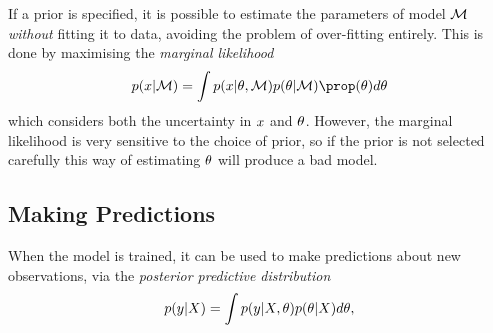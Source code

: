 If a prior is specified, it is possible to estimate the parameters of
model $\mathcal{M}$ \textit{without} fitting it to data, avoiding the
problem of over-fitting entirely. This is done by maximising the
\textit{marginal likelihood}
\begin{equation}
  \label{eq:marginal-likelihod}
  \prob(\obs \vert \model) = \int \prob(\obs \vert \hyperparam,
  \model) \prob(\hyperparam \vert \model) \prop(\hyperparam) d\hyperparam
\end{equation}
which considers both the uncertainty in $x$ and
$\theta$. However, the marginal likelihood is very sensitive to
the choice of prior, so if the prior is not selected carefully this
way of estimating $\theta$ will produce a bad model.

\subsection{Making Predictions}
When the model is trained, it can be used to make predictions
about new observations, via the \textit{posterior
  predictive distribution}
\begin{equation}
  \label{eq:posterior-predictive}
  p(y \vert X) = \int p(y|X,\theta)p(\theta \vert X) d \theta,
\end{equation}
